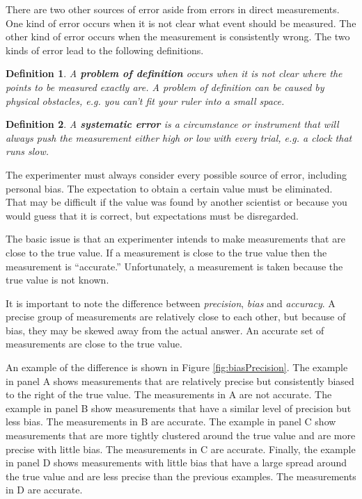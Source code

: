 \documentclass[12pt]{article}
\newtheorem{definition}{Definition}[section]
\begin{document}
There are two other sources of error aside from errors in direct
measurements\cite[pp 12-89]{introErrorAnalysis}. One kind of error
occurs when it is not clear what event should be measured. The other
kind of error occurs when the measurement is consistently wrong. The
two kinds of error lead to the following definitions.

\begin{definition}
A \textbf{problem of definition} occurs
when it is not clear where the points to be measured exactly are.  A
problem of definition can be caused by physical obstacles, e.g. you
can't fit your ruler into a small space.  
\end{definition}

\begin{definition}
A \textbf{systematic error} is a circumstance or instrument that will
always push the measurement either high or low with every trial, e.g.
a clock that runs slow.  
\end{definition}

The experimenter must always consider every possible source of error,
including personal bias.  The expectation to obtain a certain value
must be eliminated.  That may be difficult if the value was found by
another scientist or because you would guess that it is correct, but
expectations must be disregarded\cite{Gould81}.

The basic issue is that an experimenter intends to make measurements
that are close to the true value. If a measurement is close to the
true value then the measurement is ``accurate.''  Unfortunately, a
measurement is taken because the true value is not known. 

It is important to note the difference between \textit{precision},
\textit{bias} and \textit {accuracy}.  A precise group of measurements
are relatively close to each other, but because of bias, they may be
skewed away from the actual answer.  An accurate set of measurements
are close to the true value.

An example of the difference is shown in Figure
\ref{fig:biasPrecision}. The example in panel A shows measurements
that are relatively precise but consistently biased to the right of
the true value. The measurements in A are not accurate. The example in
panel B show measurements that have a similar level of precision but
less bias. The measurements in B are accurate. The example in panel C
show measurements that are more tightly clustered around the true
value and are more precise with little bias. The measurements in C are
accurate. Finally, the example in panel D shows measurements with
little bias that have a large spread around the true value and are
less precise than the previous examples. The measurements in D are
accurate.
\end{document}
